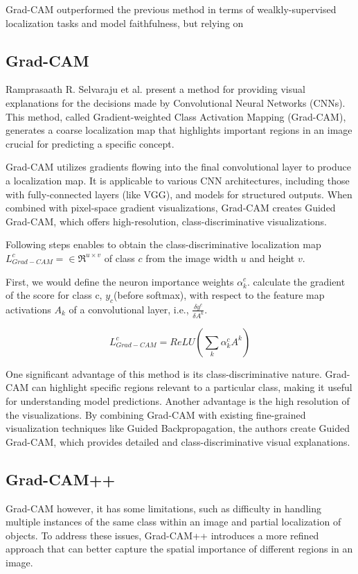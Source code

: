 Grad-CAM outperformed the previous method in terms of wealkly-supervised localization tasks and model faithfulness, but relying on 

\subsection{Grad-CAM}
Ramprasaath R. Selvaraju et al. present a method for providing visual explanations for the decisions made by Convolutional Neural Networks (CNNs). This method, called Gradient-weighted Class Activation Mapping (Grad-CAM), generates a coarse localization map that highlights important regions in an image crucial for predicting a specific concept.

Grad-CAM utilizes gradients flowing into the final convolutional layer to produce a localization map. It is applicable to various CNN architectures, including those with fully-connected layers (like VGG), and models for structured outputs. When combined with pixel-space gradient visualizations, Grad-CAM creates Guided Grad-CAM, which offers high-resolution, class-discriminative visualizations.

Following steps enables to obtain the class-discriminative localization map $L^c_{Grad-CAM} = \in\Re^{u \times v}$ of class $c$ from the image width $u$ and height $v$. 

First, we would define the neuron importance weights $\alpha^c_k$. calculate the gradient of the score for class c, $y_c$(before softmax), with respect to the feature map activations $A_k$ of a convolutional layer, i.e., $\frac{\delta y^c}{\delta A^k}$. 
 
\begin{displaymath}
    L^c_{Grad-CAM} = ReLU(\sum_k\alpha^c_kA^k)
\end{displaymath}

One significant advantage of this method is its class-discriminative nature. Grad-CAM can highlight specific regions relevant to a particular class, making it useful for understanding model predictions. Another advantage is the high resolution of the visualizations. By combining Grad-CAM with existing fine-grained visualization techniques like Guided Backpropagation, the authors create Guided Grad-CAM, which provides detailed and class-discriminative visual explanations.

\subsection{Grad-CAM++}
Grad-CAM however, it has some limitations, such as difficulty in handling multiple instances of the same class within an image and partial localization of objects. To address these issues, Grad-CAM++ introduces a more refined approach that can better capture the spatial importance of different regions in an image. 